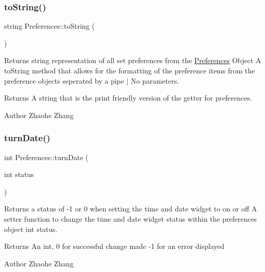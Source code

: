 \subsubsection{\texorpdfstring{to\+String()}{toString()}}
{\footnotesize\ttfamily string Preferences\+::to\+String (\begin{DoxyParamCaption}{ }\end{DoxyParamCaption})}



Returns string representation of all set preferences from the \mbox{\hyperlink{class_preferences}{Preferences}} Object  A to\+String method that allows for the formatting of the preference items from the preference objects seperated by a pipe \textquotesingle{}$\vert$\textquotesingle{}  No parameters. 

\begin{DoxyReturn}{Returns}
A string that is the print friendly version of the getter for preferences. 
\end{DoxyReturn}
\begin{DoxyAuthor}{Author}
Zhaohe Zhang 
\end{DoxyAuthor}
\mbox{\label{class_preferences_a6c2ed2905019c8231a1b9627e25c15b0}} 
\subsubsection{\texorpdfstring{turn\+Date()}{turnDate()}}
{\footnotesize\ttfamily int Preferences\+::turn\+Date (\begin{DoxyParamCaption}\item[{int}]{status }\end{DoxyParamCaption})}



Returns a status of -\/1 or 0 when setting the time and date widget to on or off  A setter function to change the time and date widget status within the preferences object  int status. 

\begin{DoxyReturn}{Returns}
An int, 0 for successful change made -\/1 for an error displayed 
\end{DoxyReturn}
\begin{DoxyAuthor}{Author}
Zhaohe Zhang 
\end{DoxyAuthor}
\mbox{\label{class_preferences_a061f9192e0abf787a7d18d40dd7712c9}} 
